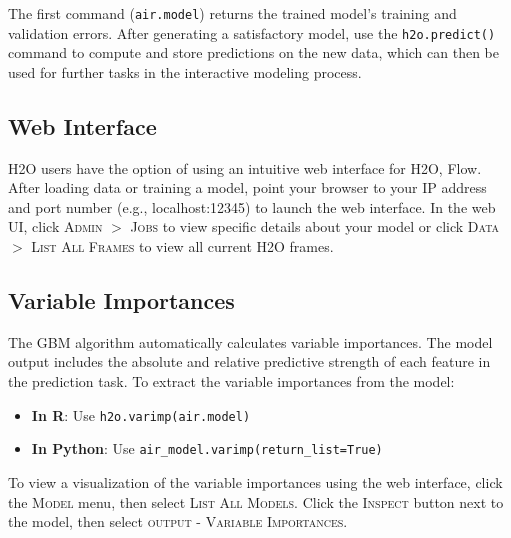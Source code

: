 The first command ({\texttt{air.model}}) returns the trained model's training and validation errors.
After generating a satisfactory model, use the \texttt{h2o.predict()} command to compute and store predictions on the
new data, which can then be used for further tasks in the interactive modeling process.

\begin{minipage}{\textwidth}
\waterExampleInR

\end{minipage}

\begin{minipage}{\textwidth}
\waterExampleInPython

\end{minipage}

\subsection{Web Interface}

H2O users have the option of using an intuitive web interface for H2O, Flow. After loading data or training a model, point your browser to your IP address and port number (e.g., localhost:12345) to launch the web interface. In the web UI, click \textsc{Admin} $>$ \textsc{Jobs} to view specific details about your model or click \textsc{Data} $>$ \textsc{List All Frames} to view all current H2O frames.


\subsection{Variable Importances}

The GBM algorithm automatically calculates variable importances. The model output includes the absolute and relative predictive strength of each feature in the prediction task. To extract the variable importances from the model:
\begin{itemize}
\item \textbf{In R}: Use \texttt{h2o.varimp(air.model)} 
\item \textbf{In Python}: Use \texttt{air\_model.varimp(return\_list=True)}
\end{itemize}

To view a visualization of the variable importances using the web interface, click the \textsc{Model} menu, then select \textsc{List All Models}. Click the \textsc{Inspect} button next to the model, then select \textsc{output - Variable Importances}. 

